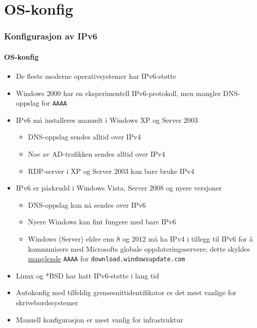 \section{OS-konfig}
\begin{frame}
  \frametitle{Konfigurasjon av IPv6}
  \framesubtitle{OS-konfig}
  \begin{itemize}
  \item De fleste moderne operativsystemer har IPv6-støtte
  \item Windows 2000 har en eksperimentell IPv6-protokoll, men mangler
    DNS-oppslag for \texttt{AAAA}
  \item IPv6 må installeres manuelt i Windows XP og Server 2003
    \begin{itemize}
    \item DNS-oppslag sendes alltid over \alert{IPv4}
    \item Noe av AD-trafikken sendes alltid over \alert{IPv4}
    \item RDP-server i XP og Server 2003 kan bare bruke \alert{IPv4}
    \end{itemize}
  \item IPv6 er påskrudd i Windows Vista, Server 2008 og nyere versjoner
    \begin{itemize}
    \item DNS-oppslag kan nå sendes over IPv6
    \item Nyere Windows kan fint fungere med bare IPv6
    \item Windows (Server) eldre enn 8 og 2012 må ha \alert{IPv4} i
      tillegg til IPv6 for å kommunisere med Microsofts globale
      oppdateringsservere; dette skyldes
      \href{https://insinuator.net/2014/05/microsoft-windows-update-over-ipv6-or-not/}{manglende}
      \texttt{AAAA} for \texttt{download.windowsupdate.com}
    \end{itemize}
  \item Linux og *BSD har hatt IPv6-støtte i lang tid
  \item Autokonfig med tilfeldig grensesnittidentifikator er det mest
    vanlige for skrivebordssystemer
  \item Manuell konfigurasjon er mest vanlig for infrastruktur
  \end{itemize}
\end{frame}

